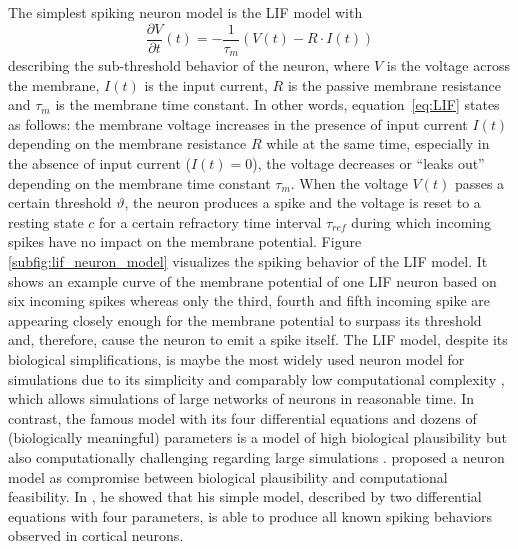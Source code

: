 The simplest spiking neuron model is the \acf{LIF} model with
\begin{equation}
\frac{\partial V}{\partial t}(t) = - \frac{1}{\tau_{m}} \left( V\left(t\right) - R \cdot I\left(t\right) \right)
\label{eq:LIF}
\end{equation}
describing the sub-threshold behavior of the neuron, where $V$ is the voltage across the membrane, $I(t)$ is the input current, $R$ is the passive membrane resistance and $\tau_{m}$ is the membrane time constant.
In other words, equation~\eqref{eq:LIF} states as follows: the membrane voltage increases in the presence of input current $I(t)$ depending on the membrane resistance $R$ while at the same time, especially in the absence of input current ($I(t)=0$), the voltage decreases or \enquote{leaks out} depending on the membrane time constant $\tau_{m}$.
When the voltage $V(t)$ passes a certain threshold $\vartheta$, the neuron produces a spike and the voltage is reset to a resting state $c$ for a certain refractory time interval $\tau_{ref}$ during which incoming spikes have no impact on the membrane potential.
Figure \ref{subfig:lif_neuron_model} visualizes the spiking behavior of the \ac{LIF} model.
It shows an example curve of the membrane potential of one \ac{LIF} neuron based on six incoming spikes whereas only the third, fourth and fifth incoming spike are appearing closely enough for the membrane potential to surpass its threshold and, therefore, cause the neuron to emit a spike itself.
The \ac{LIF} model, despite its biological simplifications, is maybe the most widely used neuron model for simulations due to its simplicity and comparably low computational complexity \parencite{Izhikevich2004}, which allows simulations of large networks of neurons in reasonable time.
In contrast, the famous \textcite{Hodgkin1952} model with its four differential equations and dozens of (biologically meaningful) parameters is a model of high biological plausibility but also computationally challenging regarding large simulations \parencite{Izhikevich2004}.
\textcite{Izhikevich2003} proposed a neuron model as compromise between biological plausibility and computational feasibility.
In \textcite{Izhikevich2004}, he showed that his simple model, described by two differential equations with four parameters, is able to produce all known spiking behaviors observed in cortical neurons. 


